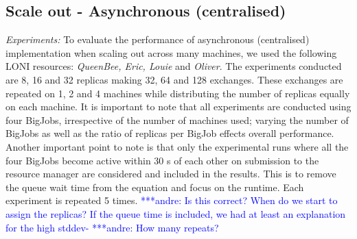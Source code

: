 \documentclass{rspublic}
\newcommand{\alnote}[1]{ {\textcolor{blue} { ***andre: #1 }}}
\newcommand{\alnote}[1]{}
\begin{document}
\subsection{Scale out - Asynchronous (centralised)}

{\it Experiments:} To evaluate the performance of asynchronous
(centralised) implementation when scaling out across many machines, we
used the following LONI resources: \emph{QueenBee, Eric, Louie} and
\emph{Oliver}. The experiments conducted are 8, 16 and 32 replicas
making 32, 64 and 128 exchanges. These exchanges are repeated on 1, 2
and 4 machines while distributing the number of replicas equally on
each machine. It is important to note that all experiments are
conducted using four BigJobs, irrespective of the number of machines
used; varying the number of BigJobs as well as the ratio of replicas
per BigJob effects overall performance.  Another important point to
note is that only the experimental runs where all the four BigJobs
become active within 30 s of each other on submission to the resource
manager are considered and included in the results. This is to remove
the queue wait time from the equation and focus on the runtime. Each
experiment is repeated 5 times.  \alnote{Is this correct? When do we
  start to assign the replicas? If the queue time is included, we had
  at least an explanation for the high stddev-} \alnote{How many
  repeats?}




\end{document}
